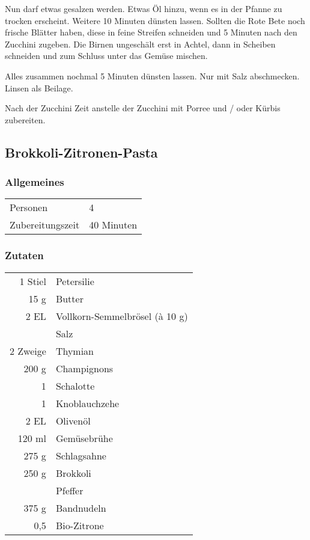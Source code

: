 Nun darf etwas gesalzen werden. Etwas Öl hinzu, wenn es in der Pfanne zu trocken erscheint. Weitere 10 Minuten dünsten lassen. Sollten die Rote Bete noch frische Blätter haben, diese in feine Streifen schneiden und 5 Minuten nach den Zucchini zugeben. Die Birnen ungeschält erst in Achtel, dann in Scheiben schneiden und zum Schluss unter das Gemüse mischen.

Alles zusammen nochmal 5 Minuten dünsten lassen. Nur mit Salz abschmecken. Linsen als Beilage.

Nach der Zucchini Zeit anstelle der Zucchini mit Porree und / oder Kürbis zubereiten.

\subsection{Brokkoli-Zitronen-Pasta}\label{sec:BrokkoliZitronenPasta}
\subsubsection*{Allgemeines}
\begin{tabular}{ll}
    Personen         &  4   \\
    Zubereitungszeit &  40 Minuten \\
\end{tabular} 
\subsubsection*{Zutaten}
\begin{tabular}{r l}
     1 Stiel & Petersilie                     \\
        15 g & Butter                         \\
        2 EL & Vollkorn-Semmelbrösel (à 10 g) \\
             & Salz                           \\
    2 Zweige & Thymian                        \\
       200 g & Champignons                    \\
           1 & Schalotte                      \\
           1 & Knoblauchzehe                  \\
        2 EL & Olivenöl                       \\
      120 ml & Gemüsebrühe                    \\
       275 g & Schlagsahne                    \\
       250 g & Brokkoli                       \\
             & Pfeffer                        \\
       375 g & Bandnudeln                     \\
         0,5 & Bio-Zitrone
\end{tabular}

